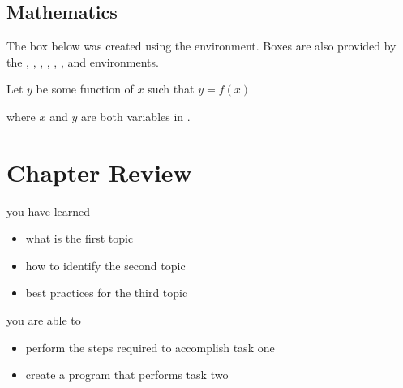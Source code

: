 %
\subsection{Mathematics}
The box below was created using the  environment. Boxes are also
provided by the , , ,
, , , and  environments.

\begin{definition}
Let $y$ be some function of $x$ such that $y = f(x)$
\end{definition}

where $x$ and $y$ are both variables in .



\blindtext

%
\section{Chapter Review}
\begin{kaobox}[frametitle=Chapter Review]
you have learned
\begin{itemize}
	\item what is the first topic
	\item how to identify the second topic
        \item best practices for the third topic
\end{itemize}

you are able to
\begin{itemize}
        \item perform the steps required to accomplish task one
        \item create a program that performs task two
\end{itemize}
\end{kaobox}






